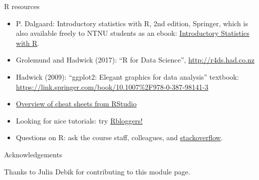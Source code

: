 \documentclass[ignorenonframetext,]{beamer}
\begin{document}
\begin{frame}

\begin{block}{R resources}

\begin{itemize}
\item
  P. Dalgaard: Introductory statistics with R, 2nd edition, Springer,
  which is also available freely to NTNU students as an ebook:
  \href{http://link.springer.com/book/10.1007\%2F978-0-387-79054-1}{Introductory
  Statistics with R}.
\item
  Grolemund and Hadwick (2017): ``R for Data Science'',
  \url{http://r4ds.had.co.nz}
\item
  Hadwick (2009): ``ggplot2: Elegant graphics for data analysis''
  textbook:
  \url{https://link.springer.com/book/10.1007\%2F978-0-387-98141-3}
\item
  \href{https://www.rstudio.com/resources/cheatsheets/}{Overview of
  cheat sheets from RStudio}
\item
  Looking for nice tutorials: try
  \href{https://www.r-bloggers.com/}{Rbloggers!}
\item
  Questions on R: ask the course staff, colleagues, and
  \href{https://stackoverflow.com/}{stackoverflow}.
\end{itemize}

\end{block}

\end{frame}

\begin{frame}{Acknowledgements}

Thanks to Julia Debik for contributing to this module page.

\end{frame}
\end{document}
